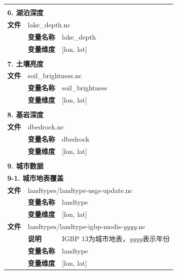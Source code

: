\documentclass[a4paper,12pt,twoside]{article}
\begin{document}
{\begin{longtable}{llp{}}
\midrule
\vspace{2\baselineskip}\\
 \multicolumn{3}{l}{\textbf{6. 湖泊深度}} \\
\cline{1-3}
\textbf{文件} & \multicolumn{2}{l}{lake\_depth.nc} \\
\cline{2-3}
& \textbf{变量名称} & lake\_depth \\
& \textbf{变量维度} & {[}lon, lat{]} \\

\midrule
\vspace{2\baselineskip}\\
 \multicolumn{3}{l}{\textbf{7. 土壤亮度}} \\
\cline{1-3}
\textbf{文件} & \multicolumn{2}{l}{soil\_brightness.nc} \\
\cline{2-3}
& \textbf{变量名称} & soil\_brightness \\
& \textbf{变量维度} & {[}lon, lat{]} \\

\midrule
\vspace{2\baselineskip}\\
 \multicolumn{3}{l}{\textbf{8. 基岩深度}} \\
\cline{1-3}
\textbf{文件} & \multicolumn{2}{l}{dbedrock.nc} \\
\cline{2-3}
& \textbf{变量名称} & dbedrock \\
& \textbf{变量维度} & {[}lon, lat{]} \\

\midrule
\vspace{2\baselineskip}\\
\multicolumn{3}{l}{\textbf{9. 城市数据}} \\
\multicolumn{3}{l}{\textbf{9-1. 城市地表覆盖}} \\
\cline{1-3}
\textbf{文件} & \multicolumn{2}{l}{landtypes/landtype-usgs-update.nc} \\
\cline{2-3}
& \textbf{变量名称} & landtype \\
& \textbf{变量维度} & {[}lon, lat{]} \\
\cline{1-3}
\textbf{文件} & \multicolumn{2}{l}{landtypes/landtype-igbp-modis-\textit{yyyy}.nc}
\\
& \textbf{说明} & IGBP 13为城市地表，\textit{yyyy}表示年份 \\
\cline{2-3}
& \textbf{变量名称} & landtype \\
& \textbf{变量维度} & {[}lon, lat{]} \\


\end{longtable}}
\end{document}
